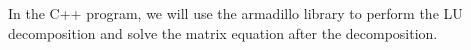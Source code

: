 \documentclass{emulateapj}
\begin{document}
In the C++ program, we will use the armadillo library to perform the LU decomposition and solve the matrix equation after the decomposition.
\end{document}
